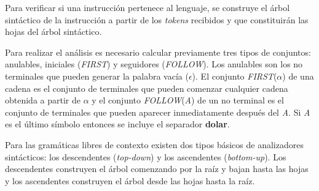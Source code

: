 Para verificar si una instrucción pertenece al lenguaje, se construye el árbol sintáctico de la instrucción a partir de los \textit{tokens} recibidos y que constituirán las hojas del árbol sintáctico. 


Para realizar el análisis es necesario calcular previamente tres tipos de conjuntos: anulables, iniciales (\textit{FIRST}) y seguidores (\textit{FOLLOW}). Los anulables son los no terminales que pueden generar la palabra vacía ($\epsilon$). El conjunto \textit{FIRST}($\alpha$) de una cadena es el conjunto de terminales que pueden comenzar cualquier cadena obtenida a partir de $\alpha$ y el conjunto \textit{FOLLOW}(\textit{A}) de un no terminal es el conjunto de terminales que pueden aparecer inmediatamente después del \textit{A}. Si \textit{A} es el último símbolo entonces se incluye el separador \textbf{dolar}. 

Para las gramáticas libres de contexto existen dos tipos básicos de analizadores sintácticos: los descendentes (\textit{top-down}) y los ascendentes (\textit{bottom-up}). Los descendentes construyen el árbol comenzando por la raíz y bajan hasta las hojas y los ascendentes construyen el árbol desde las hojas hasta la raíz.


%

	
	
	
